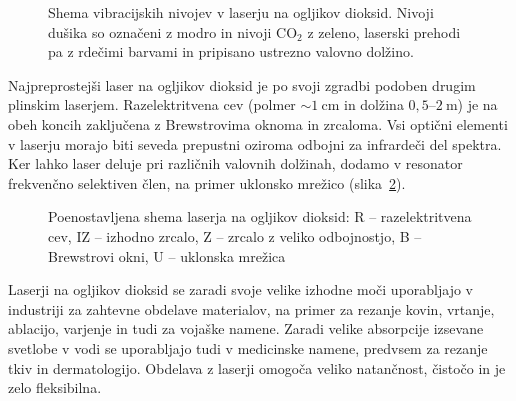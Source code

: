 \begin{figure}[ht]
\centering
\def\svgwidth{95truemm} 

\caption{Shema vibracijskih nivojev v laserju na ogljikov dioksid. 
Nivoji dušika so označeni z modro in nivoji CO$_2$ z zeleno, laserski prehodi 
pa z rdečimi barvami in pripisano ustrezno valovno dolžino.}
\label{fig:CO2E}
\end{figure}

Najpreprostejši laser na ogljikov dioksid  
je po svoji zgradbi podoben drugim plinskim laserjem. 
Razelektritvena cev (polmer $\sim 1~\si{\centi\metre}$ in dolžina $0,5$--$2~\si{\metre}$) 
je na obeh koncih zaključena z Brewstrovima oknoma in zrcaloma. Vsi optični elementi
v laserju morajo biti seveda prepustni oziroma odbojni za infrardeči del spektra. Ker lahko 
laser deluje pri različnih valovnih dolžinah, dodamo v resonator frekvenčno selektiven
člen, na primer uklonsko mrežico (slika~\ref{fig:CO2S}).

\begin{figure}[ht]
\centering
\def\svgwidth{100truemm} 

\caption{Poenostavljena shema laserja na ogljikov dioksid: R -- razelektritvena cev, 
IZ -- izhodno zrcalo, Z -- zrcalo z veliko odbojnostjo, B -- Brewstrovi okni, 
U -- uklonska mrežica
}
\label{fig:CO2S}
\end{figure}

Laserji na ogljikov dioksid se zaradi svoje velike izhodne moči uporabljajo v 
industriji za zahtevne obdelave materialov, na primer za rezanje 
kovin, vrtanje, ablacijo, varjenje in tudi za vojaške namene. Zaradi velike
absorpcije izsevane svetlobe v vodi se uporabljajo tudi v medicinske namene, predvsem
za rezanje tkiv in dermatologijo. 
Obdelava z laserji omogoča veliko natančnost, čistočo in je zelo fleksibilna.

